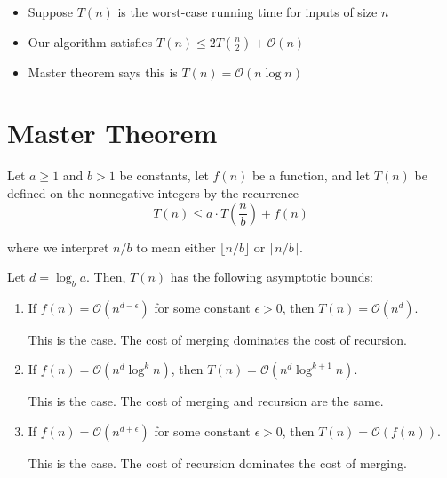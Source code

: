 \begin{itemize}
    \item Suppose $T(n)$ is the worst-case running time for inputs of size $n$
    \item Our algorithm satisfies $T(n) \le 2T(\frac{n}{2}) + \mathcal{O}(n)$
    \item Master theorem says this is $T(n) = \mathcal{O}(n \log n)$
\end{itemize}

\section{Master Theorem}

\begin{theorem}
    Let $a \ge 1$ and $b > 1$ be constants, let $f(n)$ be a function, and let $T(n)$ be defined on the nonnegative integers by the recurrence \[
        T(n) \le a \cdot T\left( \frac{n}{b} \right) + f(n)
    \]

    where we interpret $n/b$ to mean either $\lfloor n/b \rfloor$ or $\lceil n/b \rceil$. 
    
    Let $d = \log_b a$. Then, $T(n)$ has the following asymptotic bounds:
    \begin{enumerate}
        \item If $f(n) = \mathcal{O}(n^{d - \epsilon})$ for some constant $\epsilon > 0$, then $T(n) = \mathcal{O}(n^d)$.

        This is the  case. The cost of merging dominates the cost of recursion.

        \item If $f(n) = \mathcal{O}(n^d \log^k n)$, then $T(n) = \mathcal{O}(n^d \log^{k+1} n)$.

        This is the  case. The cost of merging and recursion are the same.

        \item If $f(n) = \mathcal{O}(n^{d + \epsilon})$ for some constant $\epsilon > 0$, then $T(n) = \mathcal{O}(f(n))$.

        This is the  case. The cost of recursion dominates the cost of merging.
    \end{enumerate}
\end{theorem}

